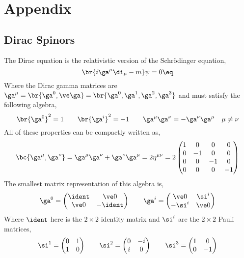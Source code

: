 \documentclass{article}
\begin{document}
\newpage
\section*{Appendix}
\setcounter{subsection}{0}
\setcounter{subsubsection}{0}
\renewcommand*{\theHsubsection}{appendix.\the\value{subsection}}
\renewcommand{\thesubsection}{\Alph{subsection}}
\subsection{Dirac Spinors}

The Dirac equation is the relativistic version of the Schrödinger equation,
\[ \br{i \ga^{\mu} \di_{\mu} - m}\psi = 0 \eq \label{eq:dirac_equation_appendix}\]
Where the Dirac gamma matrices are $\ga^{\mu} = \br{\ga^{0}, \ve \ga} = \br{\ga^{0}, \ga^{1}, \ga^{2}, \ga^{3}}$ and must satisfy the following algebra,
\[ \br{\ga^{0}}^{2} = 1 \qquad \br{\ga^{i}}^2 = -1 \qquad \ga^{\mu} \ga^{\nu} = - \ga^{\nu} \ga^{\mu} \quad \mu \neq \nu \]
All of these properties can be compactly written as,
\[ \bc{\ga^{\mu}, \ga^{\nu}} = \ga^{\mu} \ga^{\nu} + \ga^{\nu} \ga^{\mu} = 2 \eta^{\mu \nu}  = 2\begin{pmatrix}
    1 & 0 & 0 & 0 \\
    0 & -1 & 0 & 0\\
    0 & 0 & -1 & 0 \\
    0 & 0 & 0 & -1 \\
\end{pmatrix} \]
The smallest matrix representation of this algebra is,
\[ \ga^{0} = \begin{pmatrix}
    \ident & \ve 0 \\
    \ve 0 & - \ident \\
\end{pmatrix} \qquad \ga^{i} = \begin{pmatrix}
    \ve 0 & \si^{i} \\
    -\si^{i} & \ve 0 \\
\end{pmatrix} \]
Where $\ident$ here is the $2 \times 2$ identity matrix and $\si^{i}$ are the $2 \times 2$ Pauli matrices,
\[ \si^1 = \begin{pmatrix}
    0 & 1 \\ 1 & 0
\end{pmatrix} \qquad \si^{2}= \begin{pmatrix}
    0 & -i \\ i & 0
\end{pmatrix}
\qquad \si^3 = \begin{pmatrix}
    1 & 0 \\ 0 & -1
\end{pmatrix} \]
\end{document}
